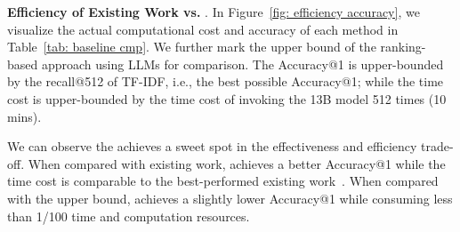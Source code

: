 

\noindent \textbf{Efficiency of Existing Work vs. \detector{}}. In Figure~\ref{fig: efficiency accuracy}, we visualize the actual computational cost and accuracy of each method in Table~\ref{tab: baseline cmp}. We further mark the upper bound of the ranking-based approach using LLMs for comparison. The Accuracy@1 is upper-bounded by the recall@512 of TF-IDF, i.e., the best possible Accuracy@1; while the time cost is upper-bounded by the time cost of invoking the 13B model 512 times (10 mins). 


We can observe the \detector{} achieves a sweet spot in the effectiveness and efficiency trade-off. When compared with existing work, \detector{} achieves a better Accuracy@1 while the time cost is comparable to the best-performed existing work~\cite{vullibminer}. When compared with the upper bound, \detector{} achieves a slightly lower Accuracy@1 while consuming less than 1/100 time and computation resources.








